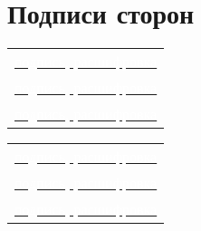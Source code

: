 \documentclass{article}
\newcommand{\red}[1]{\uline{\hspace*{1cm}\textcolor{white}{#1}\hspace*{1cm}}}
\begin{document}
  \section{Подписи сторон}
  \begin{tabular}{l}
    \red{подпись, расшифровка} \\
    \red{подпись, расшифровка} \\
    \red{подпись, расшифровка} \\
  \end{tabular} \hfill
  \begin{tabular}{l}
    \red{подпись, расшифровка} \\
    \red{подпись, расшифровка} \\
    \red{подпись, расшифровка} \\
  \end{tabular}
\end{document}
